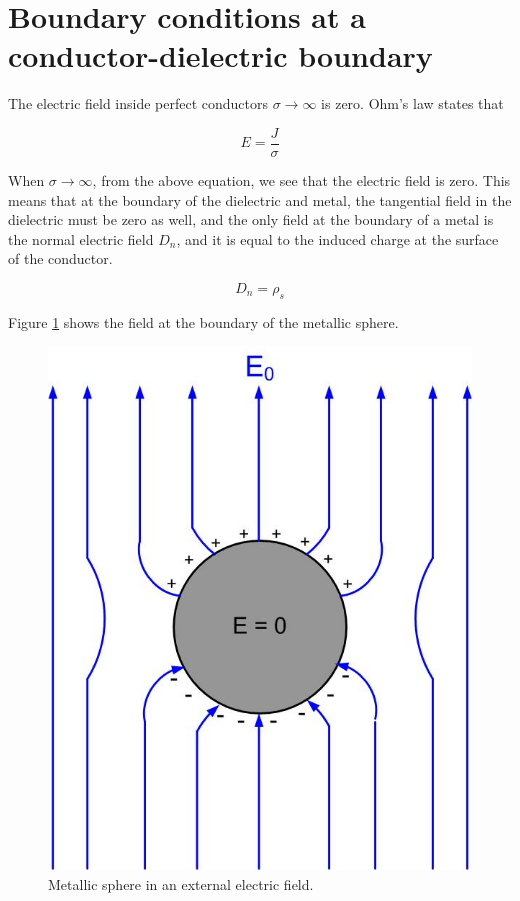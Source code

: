 \documentclass{ximera}
\begin{document}
\section{Boundary conditions at a conductor-dielectric boundary}

The electric field inside perfect conductors $\sigma \rightarrow \infty$ is zero. Ohm's law states that 

\begin{equation}
E=\frac{J}{\sigma}
\end{equation}


When $\sigma \rightarrow \infty$, from the above equation, we see that the electric field is zero. This means that at the boundary of the dielectric and metal, the tangential field in the dielectric must be zero as well, and the only field at the boundary of a metal is the normal electric field $D_n$, and it is equal to the induced charge at the surface of the conductor.

\begin{equation}
D_n = \rho_s
\end{equation}

Figure \ref{fig:BoundaryConditionMetal} shows the field at the boundary of the metallic sphere. 




\begin{figure}[htbp]
\begin{center}
\includegraphics[scale=0.5]{../jpg/metalsphereinefield.jpg}
\end{center}
\caption{Metallic sphere in an external electric field.}
\label{fig:BoundaryConditionMetal}
\end{figure}
\end{document}
